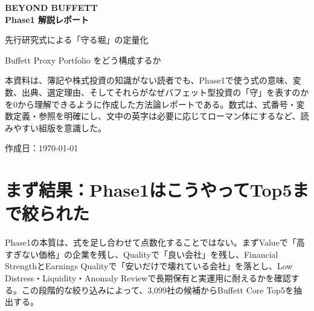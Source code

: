 \documentclass[11pt,a4paper]{article}
\begin{document}
\begin{titlepage}
\centering
\vspace*{14mm}
{\Huge\bfseries\sffamily\color{MainBlue} BEYOND BUFFETT\\[2mm] Phase1 解説レポート}\par
\vspace{6mm}
{\Large 先行研究式による「守る堀」の定量化}\par
\vspace{5mm}
{\large Buffett Proxy Portfolio をどう構成するか}\par
\vspace{13mm}
\vfill
\begin{keybox}[このPDFの目的]
本資料は、簿記や株式投資の知識がない読者でも、Phase1で使う式の意味、変数、出典、選定理由、そしてそれらがなぜバフェット型投資の「守」を表すのかを0から理解できるように作成した方法論レポートである。数式は、式番号・変数定義・参照を明確にし、文中の英字は必要に応じてローマン体にするなど、読みやすい組版を意識した。
\end{keybox}
\vspace{8mm}
{\small 作成日：\today}\par
\end{titlepage}


\section*{まず結果：Phase1はこうやってTop5まで絞られた}

\begin{keybox}[最初に見せる結論]
Phase1の本質は、式を足し合わせて点数化することではない。まずValueで「高すぎない価格」の企業を残し、Qualityで「良い会社」を残し、Financial StrengthとEarnings Qualityで「安いだけで壊れている会社」を落とし、Low Distress・Liquidity・Anomaly Reviewで長期保有と実運用に耐えるかを確認する。この段階的な絞り込みによって、3,099社の候補からBuffett Core Top5を抽出する。
\end{keybox}
\end{document}
